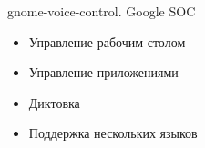 \documentclass{seminar}
\begin{document}
\begin{slide}
gnome-voice-control. Google SOC

\begin{itemize}
\item Управление рабочим столом
\item Управление приложениями
\item Диктовка
\item Поддержка нескольких языков
\end{itemize}

\end{slide}
\end{document}
